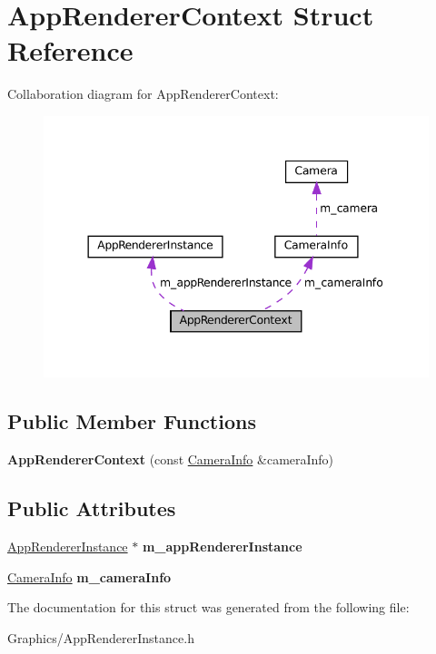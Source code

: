 \hypertarget{structAppRendererContext}{}\section{App\+Renderer\+Context Struct Reference}
\label{structAppRendererContext}


Collaboration diagram for App\+Renderer\+Context\+:\nopagebreak
\begin{figure}[H]
\begin{center}
\leavevmode
\includegraphics[width=344pt]{structAppRendererContext__coll__graph}
\end{center}
\end{figure}
\subsection*{Public Member Functions}
\begin{DoxyCompactItemize}
\item 
\mbox{\label{structAppRendererContext_a19db4ff8090083fbc6150a818acc4ec2}} 
{\bfseries App\+Renderer\+Context} (const \hyperlink{structCameraInfo}{Camera\+Info} \&camera\+Info)
\end{DoxyCompactItemize}
\subsection*{Public Attributes}
\begin{DoxyCompactItemize}
\item 
\mbox{\label{structAppRendererContext_aefb7ea01003d765275701a26d9a037e9}} 
\hyperlink{classAppRendererInstance}{App\+Renderer\+Instance} $\ast$ {\bfseries m\+\_\+app\+Renderer\+Instance}
\item 
\mbox{\label{structAppRendererContext_aec7039b02cfe5358658ede445b68f33f}} 
\hyperlink{structCameraInfo}{Camera\+Info} {\bfseries m\+\_\+camera\+Info}
\end{DoxyCompactItemize}


The documentation for this struct was generated from the following file\+:\begin{DoxyCompactItemize}
\item 
Graphics/App\+Renderer\+Instance.\+h\end{DoxyCompactItemize}
